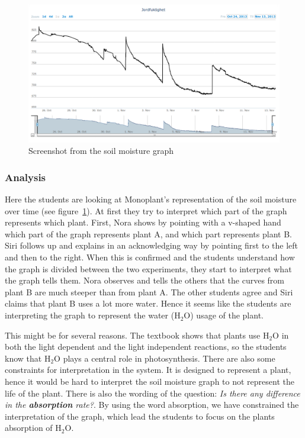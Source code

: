 \begin{figure}
	\centering
	\includegraphics[width=1.0\textwidth]{img/dataandanalasys/soilmoisturegraph.png}
	\caption{Screenshot from the soil moisture graph}
	\label{fig:soilmoistscreenshot}
\end{figure}

\subsubsection*{Analysis}
Here the students are looking at Monoplant's representation of the soil moisture over time (see figure~\ref{fig:soilmoistscreenshot}). At first they try to interpret which part of the graph represents which plant. First, Nora shows by pointing with a v-shaped hand which part of the graph represents plant A, and which part represents plant B. Siri follows up and explains in an acknowledging way by pointing first to the left and then to the right. When this is confirmed and the students understand how the graph is divided between the two experiments, they start to interpret what the graph tells them. Nora observes and tells the others that the curves from plant B are much steeper than from plant A. The other students agree and Siri claims that plant B uses a lot more water. Hence it seems like the students are interpreting the graph to represent the water ($\text{H}_2\text{O}$) usage of the plant. 

This might be for several reasons. The textbook shows that plants use $\text{H}_2\text{O}$ in both the light dependent and the light independent reactions, so the students know that $\text{H}_2\text{O}$ plays a central role in photosynthesis. There are also some constraints for interpretation in the system. It is designed to represent a plant, hence it would be hard to interpret the soil moisture graph to not represent the life of the plant. There is also the wording of the question: \emph{Is there any difference in the \textbf{absorption} rate?}. By using the word absorption, we have constrained the interpretation of the graph, which lead the students to focus on the plants absorption of $\text{H}_2\text{O}$.

